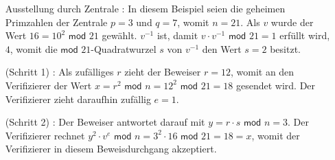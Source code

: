 \begin{itemize}
\item[Ausstellung durch Zentrale]: In diesem Beispiel seien die geheimen Primzahlen der Zentrale \( p = 3 \) und \( q = 7 \), womit \( n = 21 \). Als \( v \) wurde der Wert \( 16 = 10^2 \textsf{ mod } 21\) gewählt. \( v^{-1} \) ist, damit \( v \cdot v^{-1} \textsf{ mod } 21 = 1 \) erfüllt wird, \( 4 \), womit die \( \textsf{mod } 21 \)-Quadratwurzel \( s \) von \( v^{-1} \) den Wert \( s = 2 \) besitzt.
\item[(Schritt 1)]: Als zufälliges \( r \) zieht der Beweiser \( r = 12 \), womit an den Verifizierer der Wert \( x = r^2 \textsf{ mod } n = 12 ^ 2 \textsf{ mod } 21 = 18 \) gesendet wird. Der Verifizierer zieht daraufhin zufällig \( e = 1 \).
\item[(Schritt 2)]: Der Beweiser antwortet darauf mit \( y = r \cdot s \textsf{ mod } n = 3 \). Der Verifizierer rechnet \( y^2 \cdot v^e \textsf{ mod } n = 3^2 \cdot 16 \textsf{ mod } 21 = 18 = x \), womit der Verifizierer in diesem Beweisdurchgang akzeptiert.
\end{itemize}

\pagebreak
